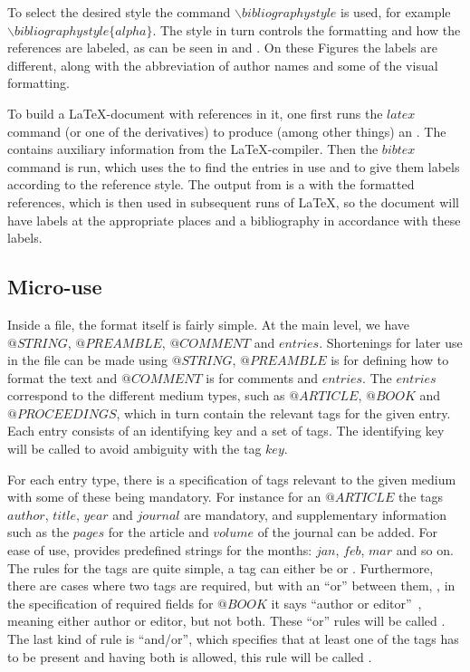To select the desired style the command
${\backslash}bibliographystyle$ is used, for example
${\backslash}bibliographystyle\{alpha\}$.  The style in turn controls
the formatting and how the references are labeled, as can be seen in
 and .
On these Figures the labels are different, along with the abbreviation
of author names and some of the visual formatting.

To build a {\LaTeX}-document with {\bibtex} references in it, one
first runs the $latex$ command (or one of the derivatives) to produce
(among other things) an .  The  contains auxiliary
information from the {\LaTeX}-compiler.  Then the $bibtex$ command is
run, which uses the  to find the entries in use and to give
them labels according to the reference style.  The output from
{\bibtex} is a  with the formatted references, which is then
used in subsequent runs of {\LaTeX}, so the document will have labels
at the appropriate places and a bibliography in accordance with these
labels.


\subsection{Micro-use}
\label{sec:about_micro_use}

Inside a {\bibtex} file, the format itself is fairly simple. At the
main level, we have $@STRING$, $@PREAMBLE$, $@COMMENT$ and $entries$.
Shortenings for later use in the {\bibtex} file can be made using
$@STRING$, $@PREAMBLE$ is for defining how to format the text and
$@COMMENT$ is for comments and $entries$.  The $entries$ correspond to
the different medium types, such as $@ARTICLE$, $@BOOK$ and
$@PROCEEDINGS$, which in turn contain the relevant tags for the given
entry.  Each entry consists of an identifying key and a set of tags.
The identifying key will be called  to avoid
ambiguity with the tag $key$.

For each entry type, there is a specification of tags relevant to the
given medium with some of these being mandatory. For instance for an
$@ARTICLE$ the tags $author$, $title$, $year$ and $journal$ are
mandatory, and supplementary information such as the $pages$ for the
article and $volume$ of the journal can be added.  For ease of use,
{\bibtex} provides predefined strings for the months: $jan$, $feb$,
$mar$ and so on.  The rules for the tags are quite simple, a tag can
either be  or .  Furthermore, there
are cases where two tags are required, but with an ``or'' between
them, \eg, in the specification of required fields for $@BOOK$ it says
``author or editor''~\cite{bibtex_roberts}, meaning either author or
editor, but not both.  These ``or'' rules will be called
.  The last kind of rule is ``and/or'', which
specifies that at least one of the tags has to be present and having
both is allowed, this rule will be called .

